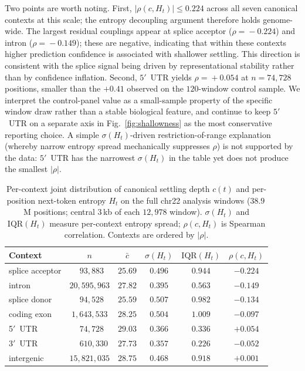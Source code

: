 \documentclass{article}
\theoremstyle{plain}
\theoremstyle{definition}
\theoremstyle{remark}
\begin{document}
Two points are worth noting. First, $|\rho(c, H_t)|\!\le\!0.224$ across
all seven canonical contexts at this scale; the entropy decoupling
argument therefore holds genome-wide. The largest residual couplings
appear at splice acceptor ($\rho\!=\!-0.224$) and intron
($\rho\!=\!-0.149$); these are negative, indicating that within these contexts higher prediction confidence is associated with shallower settling. This direction is consistent with the splice signal being driven by representational stability rather than by confidence inflation. Second,
$5'$~UTR yields $\rho\!=\!+0.054$ at $n\!=\!74{,}728$ positions, smaller
than the $+0.41$ observed on the $120$-window control sample. We
interpret the control-panel value as a small-sample property of the
specific window draw rather than a stable biological feature, and
continue to keep $5'$~UTR on a separate axis in Fig.~\ref{fig:shallowness}
as the most conservative reporting choice. A simple
$\sigma(H_t)$-driven restriction-of-range explanation (whereby narrow
entropy spread mechanically suppresses $\rho$) is not supported by the
data: $5'$~UTR has the narrowest $\sigma(H_t)$ in the table yet does
not produce the smallest $|\rho|$.

\begin{table}[!htbp]
  \caption{Per-context joint distribution of canonical settling depth
    $c(t)$ and per-position next-token entropy $H_t$ on the full chr22
    analysis windows ($38.9$\,M positions; central $3$\,kb of each
    $12{,}978$ window). $\sigma(H_t)$ and $\mathrm{IQR}(H_t)$ measure
    per-context entropy spread; $\rho(c, H_t)$ is Spearman correlation.
    Contexts are ordered by $|\rho|$.}
  \label{tab:restriction-of-range}
  \centering
  \small
  \begin{tabular}{@{}lccccc@{}}
    \toprule
    Context & $n$ & $\bar c$ & $\sigma(H_t)$ & $\mathrm{IQR}(H_t)$ & $\rho(c, H_t)$ \\
    \midrule
    splice acceptor   & $\phantom{0}{93{,}883}$ & $25.69$ & $0.496$ & $0.944$ & $-0.224$ \\
    intron            & $20{,}595{,}963$        & $27.82$ & $0.395$ & $0.563$ & $-0.149$ \\
    splice donor      & $\phantom{0}{94{,}528}$ & $25.59$ & $0.507$ & $0.982$ & $-0.134$ \\
    coding exon       & $\phantom{}1{,}643{,}533$ & $28.25$ & $0.504$ & $1.009$ & $-0.097$ \\
    5$'$~UTR          & $\phantom{0}{74{,}728}$ & $29.03$ & $0.366$ & $0.336$ & $+0.054$ \\
    3$'$~UTR          & $\phantom{00}{610{,}330}$ & $27.73$ & $0.357$ & $0.226$ & $-0.052$ \\
    intergenic        & $15{,}821{,}035$        & $28.75$ & $0.468$ & $0.918$ & $+0.001$ \\
    \bottomrule
  \end{tabular}
\end{table}
\end{document}
